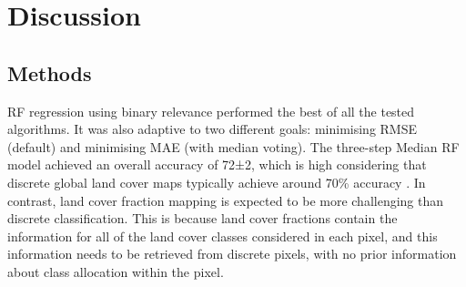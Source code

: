 \documentclass[a4paper,10pt]{article}
\begin{document}
\section{Discussion}


\subsection{Methods}

\Gls{RF} regression using binary relevance performed the best of all the tested algorithms.
It was also adaptive to two different goals: minimising \gls{RMSE} (default) and minimising \gls{MAE} (with median voting).
The three-step Median \gls{RF} model achieved an overall accuracy of 72±2, which is high considering that discrete global land cover maps typically achieve around 70\% accuracy \citep{herold_challenges_2008}.
In contrast, land cover fraction mapping is expected to be more challenging than discrete classification.
This is because land cover fractions contain the information for all of the land cover classes considered in each pixel, and this information needs to be retrieved from discrete pixels, with no prior information about class allocation within the pixel.
\end{document}
